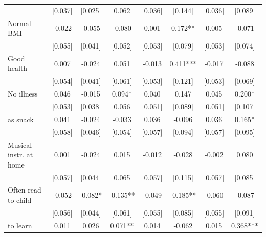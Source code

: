 \documentclass[12pt]{article}
\begin{document}
\begin{table}[ht]
\begin{center}
\begin{adjustbox}{width=1.2\textwidth,center=\textwidth}
\begin{tabular}{lccccccc}
 & [0.037] & [0.025] & [0.062] & [0.036] & [0.144] & [0.036] & [0.089]\\
{Normal BMI } & {-0.022 } & {-0.055 } & {-0.080 } & {0.001 } & {0.172{*}{*} } & {0.005 } & {-0.071 }\\
 & [0.055] & [0.041] & [0.052] & [0.053] & [0.079] & [0.053] & [0.074]\\
{Good health } & {0.007 } & {-0.024 } & {0.051 } & {-0.013 } & {0.411{*}{*}{*} } & {-0.017 } & {-0.088 }\\
 & [0.054] & [0.041] & [0.061] & [0.053] & [0.121] & [0.053] & [0.069]\\
{No illness } & {0.046 } & {-0.015 } & {0.094{*} } & {0.040 } & {0.147 } & {0.045 } & {0.200{*} }\\
 & [0.053] & [0.038] & [0.056] & [0.051] & [0.089] & [0.051] & [0.107]\\
{%
as snack } & {0.041 } & {-0.024 } & {-0.033 } & {0.036 } & {-0.096 } & {0.036 } & {0.165{*} }\\
 & [0.058] & [0.046] & [0.054] & [0.057] & [0.094] & [0.057] & [0.095]\\
{Musical instr. at home } & {0.001 } & {-0.024 } & {0.015 } & {-0.012 } & {-0.028 } & {-0.002 } & {0.080 }\\
 & [0.057] & [0.044] & [0.065] & [0.057] & [0.115] & [0.057] & [0.085]\\
{Often read to child } & {-0.052 } & {-0.082{*} } & {-0.135{*}{*} } & {-0.049 } & {-0.185{*}{*} } & {-0.060 } & {-0.087 }\\
 & [0.056] & [0.044] & [0.061] & [0.055] & [0.085] & [0.055] & [0.091]\\
{%
to learn } & {0.011 } & {0.026 } & {0.071{*}{*} } & {0.014 } & {-0.062 } & {0.015 } & {0.368{*}{*}{*} }\\

\end{tabular}
\end{adjustbox}
\end{center}
\end{table}
\end{document}
